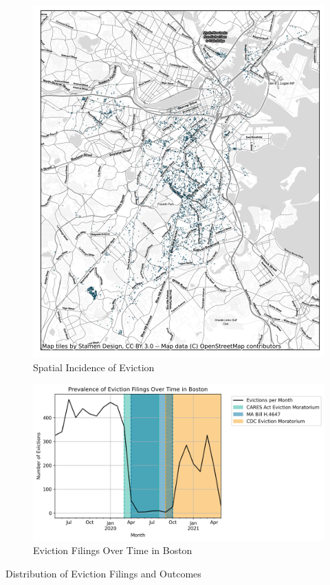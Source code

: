 \documentclass[12pt]{article}
\begin{document}
        \newpage
        \begin{figure}[H]
            \centering
            \includegraphics{output/summary_statistics/figures/evictions_map.png}
            \caption{Spatial Incidence of Eviction}
            \label{fig:my_label}
        \end{figure}

        \begin{landscape}
        \begin{figure}[H]
            \centering
            \includegraphics[scale=1.25]{output/summary_statistics/figures/filings_over_time.png}
            \caption{Eviction Filings Over Time in Boston}
            \label{fig:my_label}
        \end{figure}
\end{landscape}
        \begin{table}[H]
            \centering
            \small
            
            \caption{Distribution of Eviction Filings and Outcomes}
            \label{tab:my_label}
        \end{table}
\end{document}
